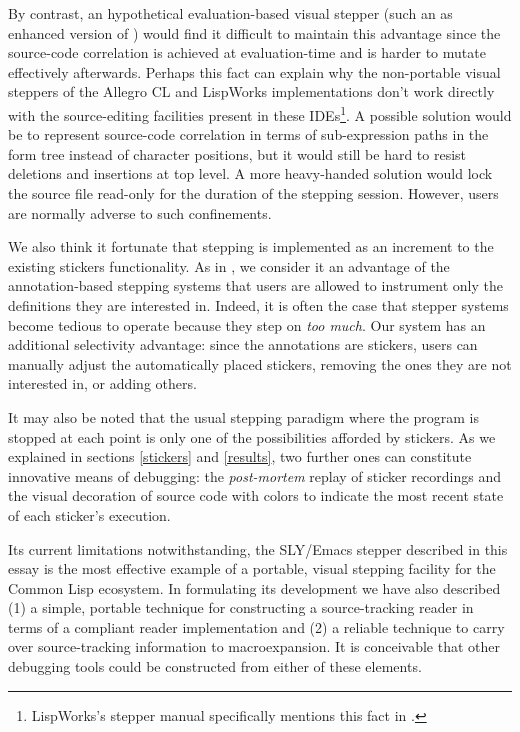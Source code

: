 \documentclass[sigconf]{acmart}
\begin{document}
By contrast, an hypothetical evaluation-based visual stepper (such an
as enhanced version of \cite{bourguignon}) would find it difficult to
maintain this advantage since the source-code correlation is achieved
at evaluation-time and is harder to mutate effectively afterwards.
Perhaps this fact can explain why the non-portable visual steppers of
the Allegro CL and LispWorks implementations don't work directly with
the source-editing facilities present in these
IDEs\footnote{LispWorks's stepper manual specifically mentions this
  fact in \cite{lispworks-stepper}.}.  A possible solution would be to
represent source-code correlation in terms of sub-expression paths in
the form tree instead of character positions, but it would still be
hard to resist deletions and insertions at top level.  A more
heavy-handed solution would lock the source file read-only for the
duration of the stepping session.  However, users are normally adverse
to such confinements.

We also think it fortunate that stepping is implemented as an
increment to the existing stickers functionality.  As in
\cite{annotation-based}, we consider it an advantage of the
annotation-based stepping systems that users are allowed to instrument
only the definitions they are interested in.  Indeed, it is often the
case that stepper systems become tedious to operate because they step
on \emph{too much}.  Our system has an additional selectivity
advantage: since the annotations are stickers, users can manually
adjust the automatically placed stickers, removing the ones they are
not interested in, or adding others.

It may also be noted that the usual stepping paradigm where the
program is stopped at each point is only one of the possibilities
afforded by stickers.  As we explained in sections \ref{stickers} and
\ref{results}, two further ones can constitute innovative means of
debugging: the \emph{post-mortem} replay of sticker recordings and the
visual decoration of source code with colors to indicate the most
recent state of each sticker's execution.

Its current limitations notwithstanding, the SLY/Emacs stepper
described in this essay is the most effective example of a portable,
visual stepping facility for the Common Lisp ecosystem.  In
formulating its development we have also described (1) a simple,
portable technique for constructing a source-tracking reader in terms
of a compliant reader implementation and (2) a reliable technique to
carry over source-tracking information to macroexpansion.  It is
conceivable that other debugging tools could be constructed from
either of these elements.
\end{document}
